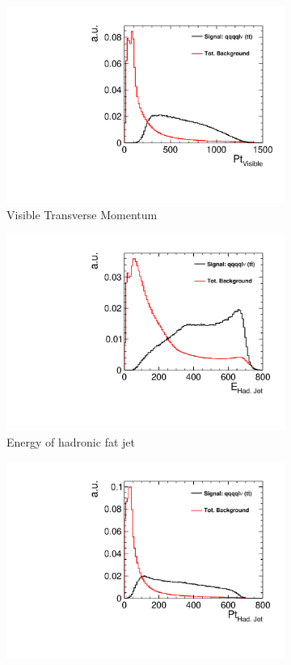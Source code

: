 \begin{figure}[]\ContinuedFloat 
  \begin{subfigure}[b]{0.5\linewidth}
    \centering
    \includegraphics[width=0.75\linewidth]{TopAnalysis/figures/BDTVariables/VisiblePt} 
    \caption{Visible Transverse Momentum} 
    \vspace{4ex}
  \end{subfigure}%
  \begin{subfigure}[b]{0.5\linewidth}
    \centering
    \includegraphics[width=0.75\linewidth]{TopAnalysis/figures/BDTVariables/HadronicEnergy.pdf} 
    \caption{Energy of hadronic fat jet} 
    \vspace{4ex}
  \end{subfigure} 
  \begin{subfigure}[b]{0.5\linewidth}
    \centering
    \includegraphics[width=0.75\linewidth]{TopAnalysis/figures/BDTVariables/HadronicPt.pdf} 

\end{subfigure}
\end{figure}
